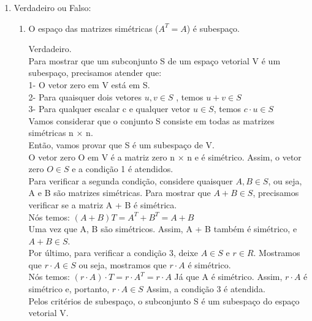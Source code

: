\documentclass[leqno]{article}
\numberwithin{equation}{section}
\begin{document}
\begin{enumerate}
		\item Verdadeiro ou Falso:
		
		\begin{enumerate}
			
			\item O espaço das matrizes simétricas ($A^T = A$) é subespaço.
			
			\begin{sol} 
				Verdadeiro.\\
				\newline
				Para mostrar que um subconjunto S de um espaço vetorial V é um subespaço, precisamos atender que:\\
				1- O vetor zero em V está em S.\\
				2- Para quaisquer dois vetores $u, v \in S$ , temos $u + v \in S$\\
				3- Para qualquer escalar c e qualquer vetor $u \in S$, temos $c \cdot u \in S$\\
				\newline		
				Vamos considerar que o conjunto S consiste em todas as matrizes simétricas n × n.\\
				Então, vamos provar que S é um subespaço de V.\\
				\newline
				O vetor zero O em V é a matriz zero n × n e é simétrico. Assim, o vetor zero $O \in S$ e a condição 1 é atendidos.\\
				\newline
				Para verificar a segunda condição, considere quaisquer $A, B \in S$, ou seja, A e B são matrizes simétricas.
				Para mostrar que $A + B \in S$, precisamos verificar se a matriz A + B é simétrica.\\
				\newline
				Nós temos:
				$(A + B) T = A^T + B^T = A + B$\\
				Uma vez que A, B são simétricos. Assim, A + B também é simétrico, e $A + B \in S$.\\
				\newline
				Por último, para verificar a condição 3, deixe $A \in S$ e $r \in R$. Mostramos que $r \cdot A \in S$ ou seja, mostramos que $r \cdot A$ é simétrico.\\
				\newline
				Nós temos:
				$(r \cdot A) \cdot T = r \cdot A^T = r \cdot A$
				\newline
				Já que A é simétrico. Assim, $r \cdot A$ é simétrico e, portanto, $r \cdot A \in S$
				Assim, a condição 3 é atendida.\\
				\newline
				Pelos critérios de subespaço, o subconjunto S é um subespaço do espaço vetorial V.\\
				\newline
			\end{sol} 
			

\end{enumerate}
\end{enumerate}
\end{document}
